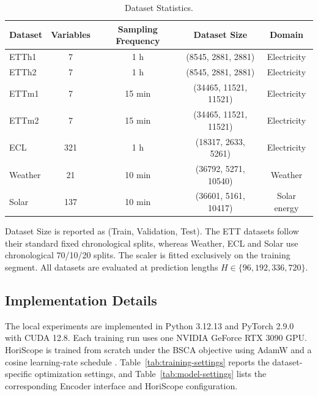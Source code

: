 \begin{table}[t]
\centering
\scriptsize
\setlength{\tabcolsep}{4pt}
\caption{Dataset Statistics.}
\label{tab:dataset-statistics}
\begin{tabular}{lcccc}
\toprule
Dataset & Variables & Sampling Frequency & Dataset Size & Domain \\
\midrule
ETTh1 & 7 & 1 h & (8545, 2881, 2881) & Electricity \\
ETTh2 & 7 & 1 h & (8545, 2881, 2881) & Electricity \\
ETTm1 & 7 & 15 min & (34465, 11521, 11521) & Electricity \\
ETTm2 & 7 & 15 min & (34465, 11521, 11521) & Electricity \\
ECL & 321 & 1 h & (18317, 2633, 5261) & Electricity \\
Weather & 21 & 10 min & (36792, 5271, 10540) & Weather \\
Solar & 137 & 10 min & (36601, 5161, 10417) & Solar energy \\
\bottomrule
\end{tabular}
\end{table}


Dataset Size is reported as (Train, Validation, Test). The ETT datasets follow their standard fixed chronological splits, whereas Weather, ECL and Solar use chronological 70/10/20 splits. The scaler is fitted exclusively on the training segment. All datasets are evaluated at prediction lengths $H\in\{96,192,336,720\}$.

\subsection{Implementation Details}


The local experiments are implemented in Python 3.12.13 and PyTorch 2.9.0 with CUDA 12.8. Each training run uses one NVIDIA GeForce RTX 3090 GPU. HoriScope is trained from scratch under the BSCA objective using AdamW and a cosine learning-rate schedule \citep{loshchilov2019adamw,loshchilov2017sgdr}. Table~\ref{tab:training-settings} reports the dataset-specific optimization settings, and Table~\ref{tab:model-settings} lists the corresponding Encoder interface and HoriScope configuration.

